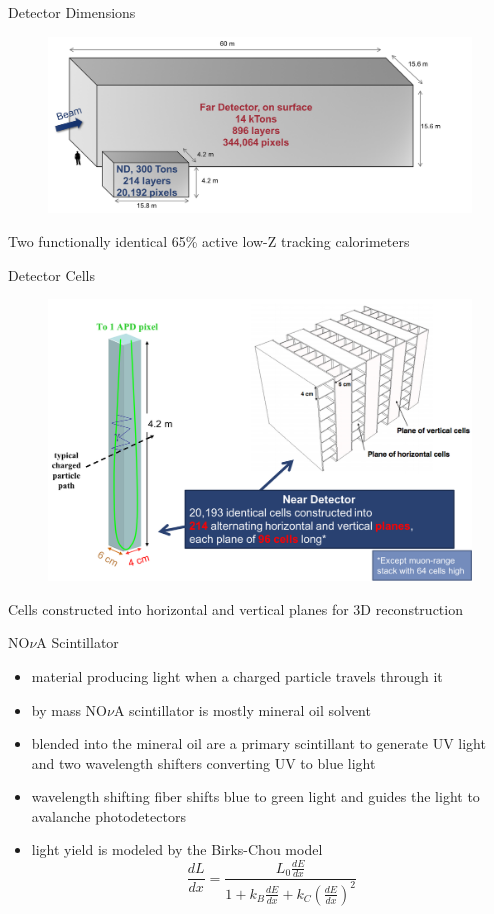 \documentclass{beamer}
\begin{document}
\begin{frame}{Detector Dimensions}
\begin{figure}
  \centering
  \includegraphics[width=\textwidth]{figures/detector_sizes.png}
\end{figure}
Two functionally identical 65\% active low-Z tracking calorimeters
\end{frame}

\begin{frame}{Detector Cells}
\begin{figure}
  \centering
  \includegraphics[width=\textwidth]{figures/nd_cells.png}
\end{figure}
\small
Cells constructed into horizontal and vertical planes for 3D reconstruction
\end{frame}

\begin{frame}{NO$\nu$A Scintillator}
\begin{itemize}
  \item material producing light when a charged particle travels through it
  \item by mass NO$\nu$A scintillator is mostly mineral oil solvent
  \item blended into the mineral oil are a primary scintillant to generate UV light and two wavelength shifters converting UV to blue light
  \item wavelength shifting fiber shifts blue to green light and guides the light to avalanche photodetectors
  \item light yield is modeled by the Birks-Chou model
  \begin{equation*}
    \frac{dL}{dx}=\frac{L_0 \frac{dE}{dx}}{1+k_B\frac{dE}{dx}+k_C\left(\frac{dE}{dx}\right)^2}
  \end{equation*}
\end{itemize}
\end{frame}
\end{document}
